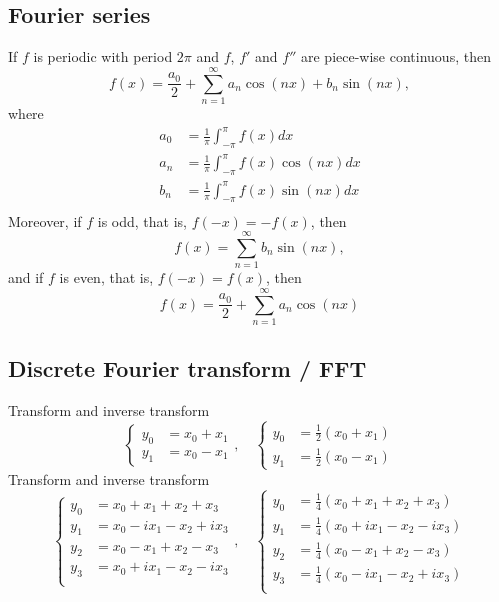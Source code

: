 \documentclass[12pt]{article}
\begin{document}
\subsection*{Fourier series}

If $f$ is periodic with period $2\pi$ and $f$, $f'$ and $f''$ are piece-wise continuous, then
$$
f(x)
=\frac{a_0}{2}
+\sum_{n=1}^\infty a_n\cos(nx)+b_n\sin(nx),
$$
where
\begin{equation*}
\begin{split}
a_0&=\frac{1}{\pi}\int_{-\pi}^{\pi}
f(x)dx\\
a_n&=\frac{1}{\pi}\int_{-\pi}^{\pi}
f(x)\cos(nx)dx\\
b_n&=\frac{1}{\pi}\int_{-\pi}^{\pi}
f(x)\sin(nx)dx\\
\end{split}
\end{equation*}
Moreover, if $f$ is odd, that is, $f(-x)=-f(x)$,
then
$$
f(x)
=\sum_{n=1}^\infty b_n\sin(nx),
$$
and if $f$ is even, that is, $f(-x)=f(x)$, then
$$
f(x)
=\frac{a_0}{2}
+\sum_{n=1}^\infty a_n\cos(nx)
$$

\subsection*{Discrete Fourier transform / FFT}

Transform and inverse transform
$$
\begin{cases}
y_0&=x_0+x_1\\
y_1&=x_0-x_1
\end{cases},\quad
\begin{cases}
y_0&=\frac{1}{2}(x_0+x_1)\\
y_1&=\frac{1}{2}(x_0-x_1)
\end{cases}
$$
Transform and inverse transform
$$
\begin{cases}
y_0&=x_0+x_1+x_2+x_3\\
y_1&=x_0-ix_1-x_2+ix_3\\
y_2&=x_0-x_1+x_2-x_3\\
y_3&=x_0+ix_1-x_2-ix_3\\
\end{cases},\quad
\begin{cases}
y_0&=\frac{1}{4}(x_0+x_1+x_2+x_3)\\
y_1&=\frac{1}{4}(x_0+ix_1-x_2-ix_3)\\
y_2&=\frac{1}{4}(x_0-x_1+x_2-x_3)\\
y_3&=\frac{1}{4}(x_0-ix_1-x_2+ix_3)\\
\end{cases}
$$



\newpage
\end{document}
